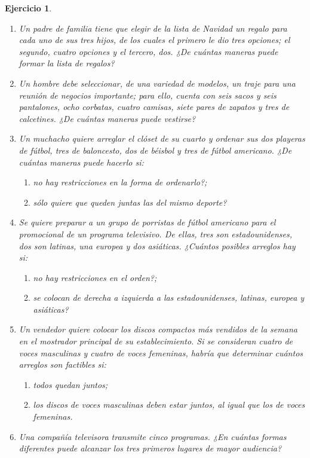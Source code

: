 \documentclass[12pt,twoside]{article}
\newtheorem{Ejer}{Ejercicio}
\begin{document}
\begin{Ejer}
\begin{enumerate}
\item Un padre de familia tiene que elegir de la lista de Navidad un regalo para cada uno de sus tres hijos, de los cuales el primero le dio tres opciones; el segundo, cuatro opciones y el tercero, dos. ¿De cuántas maneras puede formar la lista de regalos?

\item Un hombre debe seleccionar, de una variedad de modelos, un traje para una reunión de negocios importante; para ello, cuenta con seis sacos y seis pantalones, ocho corbatas, cuatro camisas, siete pares de zapatos y tres de calcetines. ¿De cuántas maneras puede vestirse?

\item Un muchacho quiere arreglar el clóset de su cuarto y ordenar sus dos playeras de fútbol, tres de baloncesto, dos de béisbol y tres de fútbol americano. ¿De cuántas maneras puede hacerlo si:
\begin{enumerate}
\item no hay restricciones en la forma de ordenarlo?;
\item sólo quiere que queden juntas las del mismo deporte?
\end{enumerate}

\item Se quiere preparar a un grupo de porristas de fútbol americano para el promocional de un programa televisivo. De ellas, tres son estadounidenses, dos son latinas, una europea y dos asiáticas. ¿Cuántos posibles arreglos hay si:
\begin{enumerate}
\item no hay restricciones en el orden?;
\item se colocan de derecha a izquierda a las estadounidenses, latinas, europea y asiáticas?
\end{enumerate}

\item Un vendedor quiere colocar los discos compactos más vendidos de la semana en el mostrador principal de su establecimiento. Si se consideran cuatro de voces masculinas y cuatro de voces femeninas, habría que determinar cuántos arreglos son factibles si:
\begin{enumerate}
\item todos quedan juntos;
\item los discos de voces masculinas deben estar juntos, al igual que los de voces femeninas.
\end{enumerate}

\item Una compañía televisora transmite cinco programas. ¿En cuántas formas diferentes puede alcanzar los tres primeros lugares de mayor audiencia?


\end{enumerate}
\end{Ejer}
\end{document}
